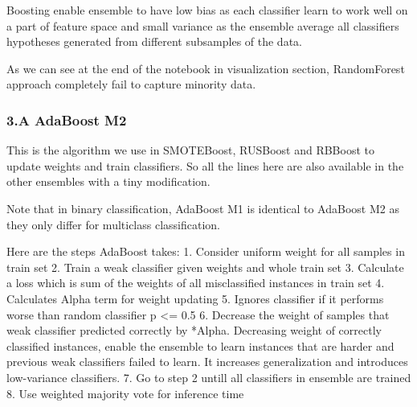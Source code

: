 \documentclass[11pt]{article}
\begin{document}
Boosting enable ensemble to have low bias as each classifier learn to
work well on a part of feature space and small variance as the ensemble
average all classifiers hypotheses generated from different subsamples
of the data.

As we can see at the end of the notebook in visualization section,
RandomForest approach completely fail to capture minority data.

    \hypertarget{a-adaboost-m2}{%
\subsubsection{3.A AdaBoost M2}\label{a-adaboost-m2}}

This is the algorithm we use in SMOTEBoost, RUSBoost and RBBoost to
update weights and train classifiers. So all the lines here are also
available in the other ensembles with a tiny modification.

Note that in binary classification, AdaBoost M1 is identical to AdaBoost
M2 as they only differ for multiclass classification.

Here are the steps AdaBoost takes: 1. Consider uniform weight for all
samples in train set 2. Train a weak classifier given weights and whole
train set 3. Calculate a loss which is sum of the weights of all
misclassified instances in train set 4. Calculates Alpha term for weight
updating 5. Ignores classifier if it performs worse than random
classifier p \textless{}= 0.5 6. Decrease the weight of samples that
weak classifier predicted correctly by *Alpha. Decreasing weight of
correctly classified instances, enable the ensemble to learn instances
that are harder and previous weak classifiers failed to learn. It
increases generalization and introduces low-variance classifiers. 7. Go
to step 2 untill all classifiers in ensemble are trained 8. Use weighted
majority vote for inference time
\end{document}
